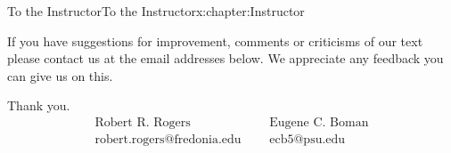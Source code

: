 \documentclass[oneside,10pt,]{book}
\numberwithin{equation}{section}
\newcommand{\amp}{&}
\begin{document}
\begin{chapterptx}{To the Instructor}{}{To the Instructor}{}{}{x:chapter:Instructor}
\par
If you have suggestions for improvement, comments or criticisms of our text please contact us at the email addresses below. We appreciate any feedback you can give us on this.%
\par
Thank you.%
\begin{equation*}
\begin{array}{lcl} \text{ Robert R. Rogers } \amp \amp  \text{ Eugene C. Boman } \\ \text{ robert.rogers@fredonia.edu }  \amp \amp  \text{ ecb5@psu.edu } \end{array}
\end{equation*}
%
\end{chapterptx}
%
%
\typeout{************************************************}
\typeout{************************************************}
%
\end{document}
